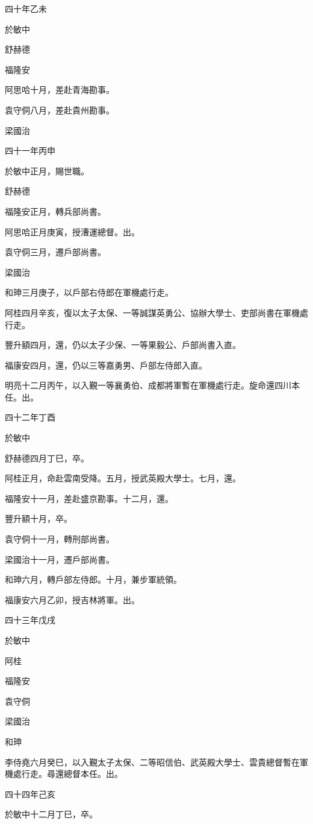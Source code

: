 \begin{pinyinscope}
四十年乙未

於敏中

舒赫德

福隆安

阿思哈十月，差赴青海勘事。

袁守侗八月，差赴貴州勘事。

梁國治

四十一年丙申

於敏中正月，賜世職。

舒赫德

福隆安正月，轉兵部尚書。

阿思哈正月庚寅，授漕運總督。出。

袁守侗三月，遷戶部尚書。

梁國治

和珅三月庚子，以戶部右侍郎在軍機處行走。

阿桂四月辛亥，復以太子太保、一等誠謀英勇公、協辦大學士、吏部尚書在軍機處行走。

豐升額四月，還，仍以太子少保、一等果毅公、戶部尚書入直。

福康安四月，還，仍以三等嘉勇男、戶部左侍郎入直。

明亮十二月丙午，以入覲一等襄勇伯、成都將軍暫在軍機處行走。旋命還四川本任。出。

四十二年丁酉

於敏中

舒赫德四月丁巳，卒。

阿桂正月，命赴雲南受降。五月，授武英殿大學士。七月，還。

福隆安十一月，差赴盛京勘事。十二月，還。

豐升額十月，卒。

袁守侗十一月，轉刑部尚書。

梁國治十一月，遷戶部尚書。

和珅六月，轉戶部左侍郎。十月，兼步軍統領。

福康安六月乙卯，授吉林將軍。出。

四十三年戊戌

於敏中

阿桂

福隆安

袁守侗

梁國治

和珅

李侍堯六月癸巳，以入覲太子太保、二等昭信伯、武英殿大學士、雲貴總督暫在軍機處行走。尋還總督本任。出。

四十四年己亥

於敏中十二月丁巳，卒。


\end{pinyinscope}

